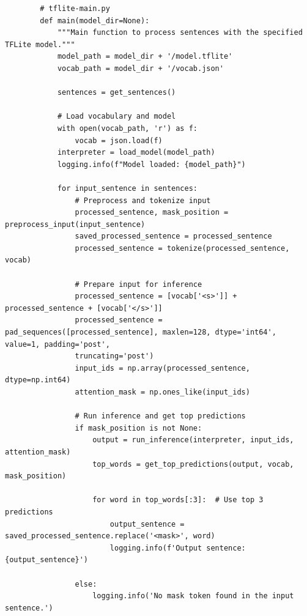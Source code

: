 \begin{listing}
    \begin{verbatim}
        # tflite-main.py
        def main(model_dir=None):
            """Main function to process sentences with the specified TFLite model."""
            model_path = model_dir + '/model.tflite'
            vocab_path = model_dir + '/vocab.json'
            
            sentences = get_sentences()
            
            # Load vocabulary and model
            with open(vocab_path, 'r') as f:
                vocab = json.load(f)
            interpreter = load_model(model_path)
            logging.info(f"Model loaded: {model_path}")
            
            for input_sentence in sentences:
                # Preprocess and tokenize input
                processed_sentence, mask_position = preprocess_input(input_sentence)
                saved_processed_sentence = processed_sentence
                processed_sentence = tokenize(processed_sentence, vocab)
                
                # Prepare input for inference
                processed_sentence = [vocab['<s>']] + processed_sentence + [vocab['</s>']]
                processed_sentence = pad_sequences([processed_sentence], maxlen=128, dtype='int64', value=1, padding='post',
                truncating='post')
                input_ids = np.array(processed_sentence, dtype=np.int64)
                attention_mask = np.ones_like(input_ids)
                
                # Run inference and get top predictions
                if mask_position is not None:
                    output = run_inference(interpreter, input_ids, attention_mask)
                    top_words = get_top_predictions(output, vocab, mask_position)
                    
                    for word in top_words[:3]:  # Use top 3 predictions
                        output_sentence = saved_processed_sentence.replace('<mask>', word)
                        logging.info(f'Output sentence: {output_sentence}')
                        
                else:
                    logging.info('No mask token found in the input sentence.')
    \end{verbatim}
    \caption[\texttt{tflite-main.py} (deel 3)]{Het derde deel van \texttt{tflite-main.py} voert de hoofdtoepassing uit, waarbij elke zin wordt verwerkt met behulp van de  interpreter. Het script legt de nadruk op het voorbereiden van de input met behulp van de aangepaste tokenizer en de  specifieke inferentie stappen. Debug- en tijdlogging is verwijderd voor compactheid.}
    \label{lst:tflite-main-part3}
\end{listing}

